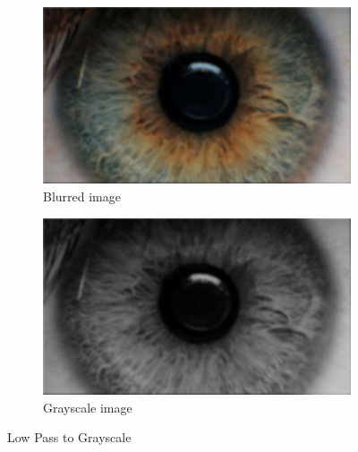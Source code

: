 \documentclass{article}
\begin{document}
%
%
\begin{figure}[H]
\centering

\begin{subfigure}{.5\textwidth}
  \centering
  \includegraphics[width=0.9\linewidth]{res/pupil/results/org_to_low.jpg}
  \caption{Blurred image}
  \label{fig:original_img}
\end{subfigure}%
\begin{subfigure}{.5\textwidth}
  \centering
  \includegraphics[width=0.9\linewidth]{res/pupil/results/low_to_gray.jpg}
  \caption{Grayscale image}
  \label{fig:gray_img}
\end{subfigure}


\caption{Low Pass to Grayscale}
\label{fig:result_pup_low_gray}
\end{figure}
\end{document}
